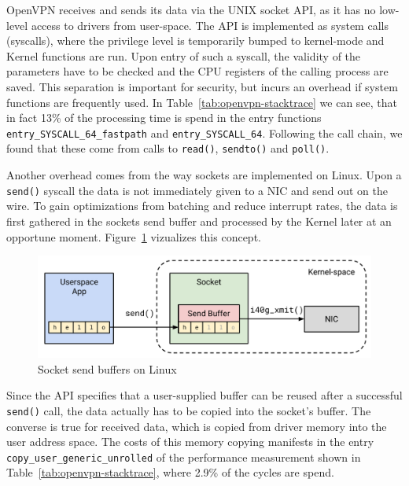 \documentclass[IN,11pt,twoside,openright,master,english]{tumthesis}
\begin{document}

OpenVPN receives and sends its data via the UNIX socket API, as it has no low-level access to drivers from user-space. The API is implemented as system calls (syscalls), where the privilege level is temporarily bumped to kernel-mode and Kernel functions are run. Upon entry of such a syscall, the validity of the parameters have to be checked and the CPU registers of the calling process are saved.
This separation is important for security, but incurs an overhead if system functions are frequently used. 
In Table~\ref{tab:openvpn-stacktrace} we can see, that in fact 13\% of the processing time is spend in the entry functions \texttt{entry\_SYSCALL\_64\_fastpath} and \texttt{entry\_SYSCALL\_64}. Following the call chain, we found that these come from calls to \texttt{read()}, \texttt{sendto()} and \texttt{poll()}.


Another overhead comes from the way sockets are implemented on Linux. 
Upon a \texttt{send()} syscall the data is not immediately given to a NIC and send out on the wire. To gain optimizations from batching and reduce interrupt rates, the data is first gathered in the sockets send buffer and processed by the Kernel later at an opportune moment. Figure~\ref{fig:socket-send-buffers} vizualizes this concept.

\begin{figure}[h]
	\centering
	\includegraphics[width=0.7\linewidth]{figures/socket-send-buffers}
	\caption{Socket send buffers on Linux}
	\label{fig:socket-send-buffers}
\end{figure}

Since the API specifies that a user-supplied buffer can be reused after a successful \texttt{send()} call, the data actually has to be copied into the socket's buffer. The converse is true for received data, which is copied from driver memory into the user address space.
The costs of this memory copying manifests in the entry \texttt{copy\_user\_generic\_unrolled} of the performance measurement shown in Table~\ref{tab:openvpn-stacktrace}, where 2.9\% of the cycles are spend.
\end{document}
